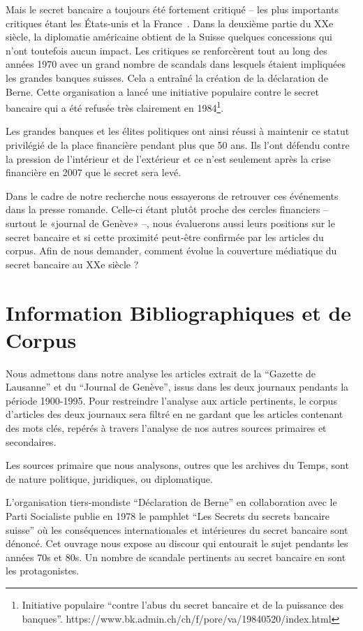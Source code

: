 \documentclass[11pt]{article}
\begin{document}
Mais le secret bancaire a toujours été fortement critiqué – les plus importants
critiques étant les États-unis et la France~\citep[p. 503]{Mazbouri12}. Dans la
deuxième partie du XXe siècle, la diplomatie américaine obtient de la Suisse
quelques concessions qui
n’ont toutefois aucun impact. Les critiques se renforcèrent tout au long des
années 1970 avec un grand nombre de scandals dans lesquels étaient impliquées
les grandes banques suisses. Cela a entraîné la création de la déclaration de
Berne. Cette organisation a lancé une initiative populaire contre le secret
bancaire qui a été refusée très clairement en 1984\footnote{Initiative populaire
``contre l'abus du secret bancaire et de la puissance des banques''.
https://www.bk.admin.ch/ch/f/pore/va/19840520/index.html}.

Les grandes banques et les élites politiques ont ainsi réussi à maintenir ce
statut privilégié de la place financière pendant plus que 50 ans. Ils l’ont
défendu contre la pression de l’intérieur et de l’extérieur et ce n’est
seulement après la crise financière en 2007 que le secret sera levé.

Dans le cadre de notre recherche nous essayerons de retrouver ces événements
dans la presse romande. Celle-ci étant plutôt proche des cercles financiers –
surtout le «journal de Genève» –, nous évaluerons aussi leurs positions sur le
secret bancaire et si cette proximité peut-être confirmée par les articles du
corpus. Afin de nous demander, comment évolue la couverture médiatique du secret
bancaire au XXe siècle ? 

\section{Information Bibliographiques et de Corpus}
Nous admettons dans notre analyse les articles extrait de la “Gazette de
Lausanne” et du “Journal de Genève”, issus dans les deux journaux pendants la
période 1900-1995. Pour restreindre l’analyse aux article pertinents, le corpus
d’articles des deux journaux sera filtré en ne gardant que les articles
contenant des mots clés, repérés à travers l’analyse de nos autres sources
primaires et secondaires.

Les sources primaire que nous analysons, outres que les archives du Temps, sont
de nature politique, juridiques, ou diplomatique.

L’organisation tiers-mondiste “Déclaration de Berne” en collaboration avec le
Parti Socialiste publie en 1978 le pamphlet “Les Secrets du secrets bancaire
suisse” \citep{GiovanniniPierLuigi1978Lsds} où les conséquences internationales
et intérieures du secret bancaire sont dénoncé. Cet ouvrage nous expose au
discour qui entourait le sujet pendants les années 70s et 80s. Un nombre de
scandale pertinents au secret bancaire en sont les protagonistes.
\end{document}
